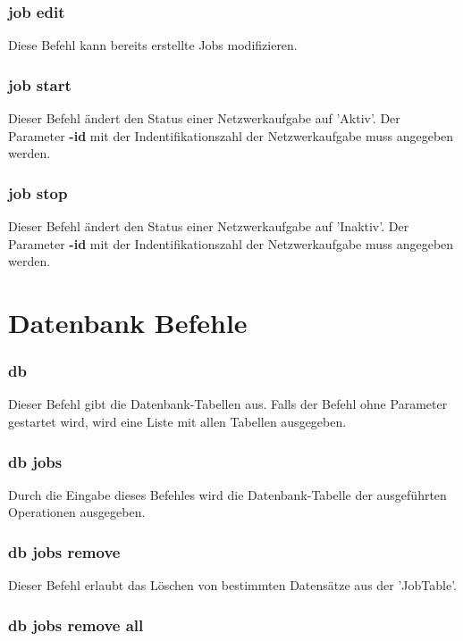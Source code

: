 \documentclass[12pt,a4paper]{report}
\begin{document}
\subsubsection{job edit}

Diese Befehl kann bereits erstellte Jobs modifizieren. 

\subsubsection{job start}

Dieser Befehl ändert den Status einer Netzwerkaufgabe auf 'Aktiv'. Der Parameter \textbf{-id} mit der Indentifikationszahl der Netzwerkaufgabe muss angegeben werden.

\subsubsection{job stop}

Dieser Befehl ändert den Status einer Netzwerkaufgabe auf 'Inaktiv'. Der Parameter \textbf{-id} mit der Indentifikationszahl der Netzwerkaufgabe muss angegeben werden.

\section{Datenbank Befehle}

\subsubsection{db}

Dieser Befehl gibt die Datenbank-Tabellen aus. Falls der Befehl ohne Parameter gestartet wird, wird eine Liste mit allen Tabellen ausgegeben.

\subsubsection{db jobs}

Durch die Eingabe dieses Befehles wird die Datenbank-Tabelle der ausgeführten Operationen ausgegeben.

\subsubsection{db jobs remove}

Dieser Befehl erlaubt das Löschen von bestimmten Datensätze aus der 'JobTable'.

\subsubsection{db jobs remove all}
\end{document}

